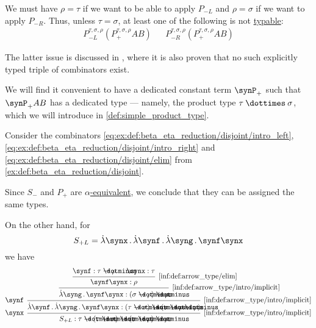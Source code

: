 \begin{example}
\begin{thmenum}
    We must have \( \rho = \tau \) if we want to be able to apply \( P_{-L} \) and \( \rho = \sigma \) if we want to apply \( P_{-R} \). Thus, unless \( \tau = \sigma \), at least one of the following is not \hyperref[def:typability]{typable}:
    \begin{align*}
      P_{-L}^{\tau,\sigma,\rho} (P_+^{\tau,\sigma,\rho} A B)
      &&
      P_{-R}^{\tau,\sigma,\rho} (P_+^{\tau,\sigma,\rho} A B)
    \end{align*}

    The latter issue is discussed in \cite{MathOF:product_type_in_simply_typed_lambda_terms}, where it is also proven that no such explicitly typed triple of combinators exist.

    We will find it convenient to have a dedicated constant term \( \synP_+ \) such that \( \synP_+ A B \) has a dedicated type --- namely, the product type \( \tau \syntimes \sigma \), which we will introduce in \cref{def:simple_product_type}.

     Consider the combinators \ref{eq:ex:def:beta_eta_reduction/disjoint/intro_left}, \ref{eq:ex:def:beta_eta_reduction/disjoint/intro_right} and \ref{eq:ex:def:beta_eta_reduction/disjoint/elim} from \cref{ex:def:beta_eta_reduction/disjoint}.

    Since \( S_- \) and \( P_+ \) are \hyperref[def:lambda_term_alpha_equivalence]{\( \alpha \)-equivalent}, we conclude that they can be assigned the same types.

    On the other hand, for
    \begin{equation*}
      S_{+L} = \qabs \synx \qabs \synf \qabs \syng \synf \synx
    \end{equation*}
    we have
    \begin{equation*}
      \begin{prooftree}
        \hypo{ \synf: \tau \synimplies \rho }
        \hypo{ \synx: \tau }
        \infer2[\ref{inf:def:arrow_type/elim}]{ \synf \synx: \rho }
        \infer1[\ref{inf:def:arrow_type/intro/implicit}]{ \qabs \syng \synf \synx: (\sigma \synimplies \rho) \synimplies \rho }
        \infer[left label=\( \synf \)]1[\ref{inf:def:arrow_type/intro/implicit}]{ \qabs \synf \qabs \syng \synf \synx: (\tau \synimplies \sigma) \synimplies (\sigma \synimplies \rho \synimplies \rho) }
        \infer[left label=\( \synx \)]1[\ref{inf:def:arrow_type/intro/implicit}]{ S_{+L}: \tau \synimplies (\tau \synimplies \sigma) \synimplies (\sigma \synimplies \rho) \synimplies \rho }
      \end{prooftree}
    \end{equation*}


\end{thmenum}
\end{example}
